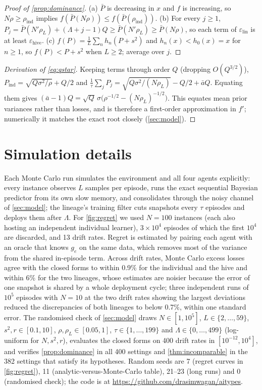 \documentclass[11pt]{article}
\theoremstyle{plain}
\theoremstyle{definition}
\theoremstyle{remark}
\newcommand{\abar}{\bar a}
\newcommand{\Pbar}{\bar P}
\newcommand{\eps}{\varepsilon}
\begin{document}
\begin{proof}[Proof of \cref{prop:dominance}]
(a) $\Pbar$ is decreasing in $x$ and $f$ is increasing, so $N\rho\ge\rho_{\mathrm{ind}}$ implies $f(\Pbar(N\rho))\le f(\Pbar(\rho_{\mathrm{ind}}))$. (b) For every $j\ge1$, $P_j=\Pbar(N'\rho_L)+(\Lambda+j-1)Q\ge\Pbar(N'\rho_L)\ge\Pbar(N\rho)$, so each term of $\eps_{\mathrm{lin}}$ is at least $\eps_{\mathrm{hive}}$. (c) $f(P)=\frac1L\sum_nh_n(P+s^2)$ and $h_n(x)<h_0(x)=x$ for $n\ge1$, so $f(P)<P+s^2$ when $L\ge2$; average over $j$.
\end{proof}

\begin{proof}[Derivation of \eqref{eq:qstar}]
Keeping terms through order $Q$ (dropping $O(Q^{3/2})$), $P_{\mathrm{ind}}=\sqrt{Q\sigma^2/\rho}+Q/2$ and $\frac1\tau\sum_jP_j=\sqrt{Q\sigma^2/(N\rho_L)}-Q/2+\abar Q$. Equating them gives $(\abar-1)Q=\sqrt{Q}\,\sigma\big(\rho^{-1/2}-(N\rho_L)^{-1/2}\big)$. This equates mean prior variances rather than losses, and is therefore a first-order approximation in $f'$; numerically it matches the exact root closely (\cref{sec:model}).
\end{proof}

\section{Simulation details}
\label{app:sim}

Each Monte Carlo run simulates the environment and all four agents explicitly: every instance observes $L$ samples per episode, runs the exact sequential Bayesian predictor from its own slow memory, and consolidates through the noisy channel of \cref{sec:model}; the lineage's training filter cuts snapshots every $\tau$ episodes and deploys them after $\Lambda$. For \cref{fig:regret} we used $N=100$ instances (each also hosting an independent individual learner), $3\times10^4$ episodes of which the first $10^4$ are discarded, and 13 drift rates. Regret is estimated by pairing each agent with an oracle that knows $g_e$ on the same data, which removes most of the variance from the shared in-episode term. Across drift rates, Monte Carlo excess losses agree with the closed forms to within 0.9\% for the individual and the hive and within 6\% for the two lineages, whose estimates are noisier because the error of one snapshot is shared by a whole deployment cycle; three independent runs of $10^5$ episodes with $N=10$ at the two drift rates showing the largest deviations reduced the discrepancies of both lineages to below 0.7\%, within one standard error. The randomised check of \cref{sec:model} draws $N\in[1,10^5]$, $L\in\{2,\dots,59\}$, $s^2,r\in[0.1,10]$, $\rho,\rho_L\in[0.05,1]$, $\tau\in\{1,\dots,199\}$ and $\Lambda\in\{0,\dots,499\}$ (log-uniform for $N,s^2,r$), evaluates the closed forms on 400 drift rates in $[10^{-12},10^4]$, and verifies \cref{prop:dominance} in all 400 settings and \cref{thm:incomparable} in the 382 settings that satisfy its hypotheses. Random seeds are 7 (regret curves in \cref{fig:regret}), 11 (analytic-versus-Monte-Carlo table), 21--23 (long runs) and 0 (randomised check); the code is at \url{https://github.com/drasimwagan/aitypes}.
\end{document}
